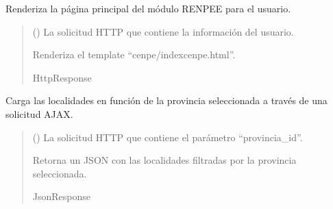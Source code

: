 \documentclass[letterpaper,10pt,spanish]{sphinxmanual}
\begin{document}
\begin{fulllineitems}

\pysigstartsignatures
{}
\pysigstopsignatures
\sphinxAtStartPar
Renderiza la página principal del módulo RENPEE para el usuario.
\begin{quote}\begin{description}
\sphinxAtStartPar
{} () \textendash{} La solicitud HTTP que contiene la información del usuario.

\sphinxAtStartPar
Renderiza el template “cenpe/indexcenpe.html”.

\sphinxAtStartPar
HttpResponse

\end{description}\end{quote}

\end{fulllineitems}



\begin{fulllineitems}

\pysigstartsignatures
{}
\pysigstopsignatures
\sphinxAtStartPar
Carga las localidades en función de la provincia seleccionada a través de una solicitud AJAX.
\begin{quote}\begin{description}
\sphinxAtStartPar
{} () \textendash{} La solicitud HTTP que contiene el parámetro “provincia\_id”.

\sphinxAtStartPar
Retorna un JSON con las localidades filtradas por la provincia seleccionada.

\sphinxAtStartPar
JsonResponse

\end{description}\end{quote}

\end{fulllineitems}
\end{document}
